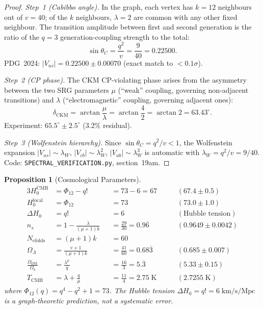 \documentclass[12pt,a4paper]{article}
\newtheorem{proposition}[theorem]{Proposition}
\begin{document}
\begin{proof}
\emph{Step~1 (Cabibbo angle).}
In the graph, each vertex has $k = 12$ neighbours out of $v = 40$;
of the $k$ neighbours, $\lambda = 2$ are common with any other
fixed neighbour.  The transition amplitude between first and second
generation is the ratio of the $q = 3$ generation-coupling
strength to the total:
\[
  \sin\theta_C = \frac{q^2}{v} = \frac{9}{40} = 0.22500.
\]
PDG~2024: $|V_{us}| = 0.22500 \pm 0.00070$ (exact match
to $< 0.1\sigma$).

\emph{Step~2 (CP phase).}
The CKM CP-violating phase arises from the asymmetry between
the two SRG parameters $\mu$ (``weak'' coupling, governing
non-adjacent transitions) and $\lambda$ (``electromagnetic''
coupling, governing adjacent ones):
\[
  \delta_{\mathrm{CKM}} = \arctan\!\frac{\mu}{\lambda}
  = \arctan\frac{4}{2} = \arctan 2 = 63.43^\circ.
\]
Experiment: $65.5^\circ \pm 2.5^\circ$ (3.2\% residual).

\emph{Step~3 (Wolfenstein hierarchy).}
Since $\sin\theta_C = q^2/v < 1$, the Wolfenstein expansion
$|V_{us}| \sim \lambda_W$, $|V_{cb}| \sim \lambda_W^2$,
$|V_{ub}| \sim \lambda_W^3$ is automatic with
$\lambda_W = q^2/v = 9/40$.
Code: \texttt{SPECTRAL\_VERIFICATION.py}, section~19am.
\end{proof}


\begin{proposition}[Cosmological Parameters]\label{prop:cosmo}
\begin{alignat*}{3}
  H_0^{\mathrm{CMB}} &= \Phi_{12} - q! &&= 73 - 6 = 67 &\;& (67.4 \pm 0.5)\\
  H_0^{\mathrm{local}}&= \Phi_{12} &&= 73 && (73.0 \pm 1.0) \\
  \Delta H_0 &= q! &&= 6 && (\text{Hubble tension}) \\
  n_s &= 1 - \frac{\lambda}{(\mu{+}1)k} &&= \frac{29}{30} = 0.9\overline{6} \quad&& (0.9649 \pm 0.0042) \\
  N_{\mathrm{efolds}} &= (\mu{+}1)k &&= 60 && \\
  \Omega_\Lambda &= \frac{v+1}{(\mu{+}1)k} &&= \frac{41}{60} = 0.68\overline{3} && (0.685 \pm 0.007) \\
  \frac{\Omega_{\mathrm{DM}}}{\Omega_b}
    &= \frac{\lambda^\mu}{q} &&= \frac{16}{3} = 5.\overline{3} && (5.33 \pm 0.15) \\
  T_{\mathrm{CMB}} &= \lambda + \frac{q}{\mu} &&= \frac{11}{4} = 2.75\;\mathrm{K}
    \quad&& (2.7255\;\mathrm{K})
\end{alignat*}
where $\Phi_{12}(q) = q^4 - q^2 + 1 = 73$.
The Hubble tension $\Delta H_0 = q! = 6\;\mathrm{km/s/Mpc}$
is a graph-theoretic prediction, not a systematic error.
\end{proposition}
\end{document}
